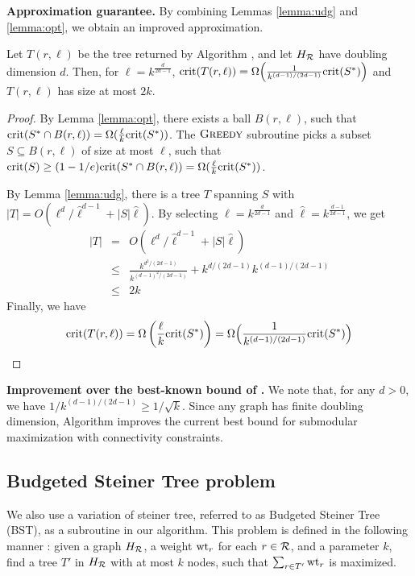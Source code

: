 \noindent
\textbf{Approximation guarantee.} By combining Lemmas \ref{lemma:udg} and \ref{lemma:opt}, we obtain an improved approximation.
\begin{theorem}
\label{theorem:submod}
Let $T(r, \ell)$ be the tree returned by Algorithm \algosubmod{}, and let $H_{\mathcal{R}}$ have doubling dimension $d$. Then, for $\ell=k^{\frac{d}{2d-1}}$, $\text{crit}(T(r, \ell))=\Omega\Big(\frac{1}{k^{(d-1)/(2d-1)}} \text{crit}(S^*)\Big)$ and $T(r, \ell)$ has size at most $2k$.
\end{theorem}
\begin{proof}
By Lemma \ref{lemma:opt}, there exists a ball $B(r, \ell)$, such that $\text{crit}(S^*\cap B(r, \ell))=\Omega(\frac{\ell}{k}\text{crit}(S^*))$.
The $\textsc{Greedy}$ subroutine picks a subset $S\subseteq B(r, \ell)$ of size at most $\ell$, such that $\text{crit}(S)\geq(1-1/e) \text{crit}(S^*\cap B(r, \ell)) = \Omega(\frac{\ell}{k} \text{crit}(S^*))$.

By Lemma \ref{lemma:udg}, there is a tree $T$ spanning $S$ with $|T|=O(\ell^d/\hat{\ell}^{d-1}+|S|\hat{\ell})$.
By selecting $\ell=k^{\frac{d}{2d-1}}$ and $\hat{\ell}=k^{\frac{d-1}{2d-1}}$, we get
\begin{eqnarray*}
|T| &=&O(\ell^d/\hat{\ell}^{d-1}+|S|\hat{\ell})\\
&\leq& \frac{k^{d^2/(2d-1)}}{k^{(d-1)^2/(2d-1)}} + k^{d/(2d-1)}k^{(d-1)/(2d-1)}\\
&\leq& 2k
\end{eqnarray*}
Finally, we have 
\[
\text{crit}(T(r, \ell))=\Omega\left(\frac{\ell}{k}\text{crit}(S^*)\right) = \Omega\Big(\frac{1}{k^{(d-1)/(2d-1)}} \text{crit}(S^*)\Big)
\]
\end{proof}

\noindent
\textbf{Improvement over the best-known bound of \cite{kuo2015maximizing}.} We note that, for any $d> 0$, we have $1/k^{(d-1)/(2d-1)}\geq 1/\sqrt{k}$. Since any graph has finite doubling dimension, Algorithm \algosubmod{} improves the current best bound for submodular maximization with connectivity constraints.


\subsection{Budgeted Steiner Tree problem}
\label{sec:algomaxst}
We also use a variation of steiner tree, referred to as Budgeted Steiner Tree (\textsc{BST}), as a subroutine in our algorithm. This problem is defined in the following manner \cite{Johnson2000PCS}:
given a graph $H_{\mathcal{R}}$, a weight $\text{wt}_r$ for each $r\in \mathcal{R}$, and a parameter $k$, find a tree $T'$ in $H_{\mathcal{R}}$ with at most $k$ nodes, such that $\sum_{r\in T'} \text{wt}_r$ is maximized.

